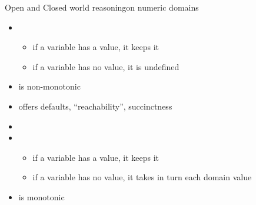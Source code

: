 \begin{frame}{Open and Closed world reasoning}{on numeric domains}
  \bigskip
  \begin{itemize}
  \item<1-> 
    \begin{itemize}
    \item if a variable has a value,  it keeps it
    \item if a variable has no value, it is undefined
    \end{itemize}
  \item<only@3->[] is non-monotonic
  \item<only@4->[] offers defaults, ``reachability'', succinctness
  \item<only@1-3>[]
  \item<2-> 
    \begin{itemize}
    \item if a variable has a value,  it keeps it
    \item if a variable has no value, it takes in turn each domain value
    \end{itemize}
  \item<only@3->[] is monotonic
  \end{itemize}
\end{frame}
%
